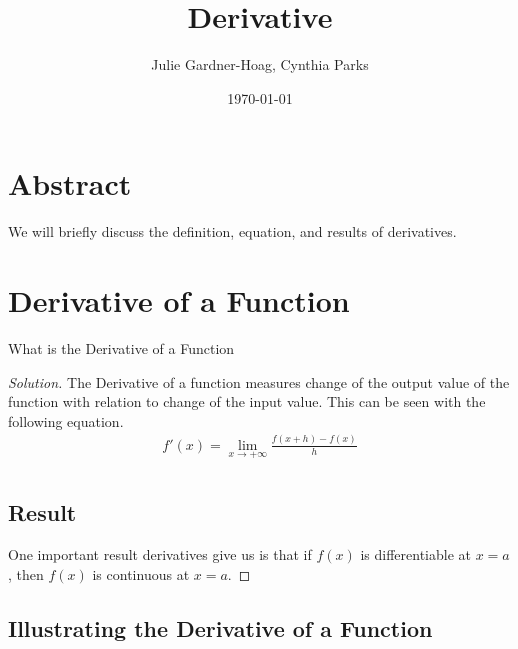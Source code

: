 \documentclass[aps,pra,notitlepage,amsmath,amssymb,letterpaper,12pt]{revtex4-1}
\newenvironment{problem}[2][Problem]{\begin{trivlist}
\item[\hskip \labelsep {\bfseries #1}\hskip \labelsep {\bfseries #2.}]}{\end{trivlist}}
\newenvironment{solution}{\begin{proof}[Solution]}{\end{proof}}
\begin{document}
\title{Derivative}
\author{Julie Gardner-Hoag, Cynthia Parks}
\date{\today}

\maketitle

\section{Abstract} %
We will briefly discuss the definition, equation, and results of derivatives.

\section{Derivative of a Function} %

\begin{problem}{1}
  What is the Derivative of a Function
\end{problem}

\begin{solution} %
The Derivative of a function measures change of the output value of the function with relation to change of the input value.  This can be seen with the following equation.
\begin{align}
f'(x)= \lim_{x \to +\infty} \frac{f(x+h) - f(x)}{h}\\
\nonumber
\end{align}
\subsection{Result} %
One important result derivatives give us is that if $f(x)$ is differentiable at $x=a$, then $f(x)$ is continuous at $x=a$.
\end{solution}

\subsection{Illustrating the Derivative of a Function} %
\end{document}
